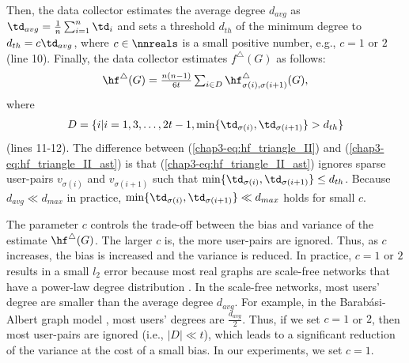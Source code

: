 Then, the data collector estimates the average degree $d_{avg}$ as $\td_{avg} = \frac{1}{n}\sum_{i=1}^n \td_i$ and sets a threshold $d_{th}$ of the minimum degree to $d_{th} = c \td_{avg}$, where $c \in \nnreals$ is a small positive number, e.g., $c=1$ or $2$ (line 10). 
Finally, the data collector estimates $f^\triangle(G)$ as follows: 
\begin{align}
    \hf^\triangle(G) = \textstyle{\frac{n(n-1)}{6t} \sum_{i \in D} \hf_{\sigma(i),\sigma(i+1)}^\triangle(G)}, 
   \label{chap3-eq:hf_triangle_II_ast}
\end{align}
where 
\begin{align*}
D = \{i | i = 1, 3, \ldots, 2t-1, 
  \min\{\td_{\sigma(i)}, \td_{\sigma(i+1)}\} > d_{th}\}
\end{align*}
(lines 11-12). 
The difference between (\ref{chap3-eq:hf_triangle_II}) and (\ref{chap3-eq:hf_triangle_II_ast}) is that (\ref{chap3-eq:hf_triangle_II_ast}) ignores sparse user-pairs $v_{\sigma(i)}$ and $v_{\sigma(i+1)}$ such that $\min\{\td_{\sigma(i)}, \td_{\sigma(i+1)}\} \leq d_{th}$. 
Because $d_{avg} \ll d_{max}$ in practice,  
$\min\{\td_{\sigma(i)}, \td_{\sigma(i+1)}\} \ll d_{max}$ holds for small $c$. 

The parameter $c$ controls the trade-off between the bias and variance of the estimate $\hf^\triangle(G)$. 
The larger $c$ is, the more user-pairs are ignored. 
Thus, as $c$ increases, the bias is increased and the variance is reduced. 
In practice, $c=1$ or $2$ results in a small $l_2$ error %
because most real graphs are scale-free networks that have a power-law degree distribution \cite{NetworkScience}. 
In the scale-free networks, most users' degree are smaller than the average degree $d_{avg}$. 
For example, in the Barab\'{a}si-Albert graph model \cite{NetworkScience,Hagberg_SciPy08}, 
most users' degrees are $\frac{d_{avg}}{2}$. 
Thus, if we set 
$c=1$ or $2$, 
then most user-pairs are ignored (i.e., $|D| \ll t$), which leads to a significant reduction of the variance at the cost of a small bias. 
In our experiments, we set $c=1$. 

